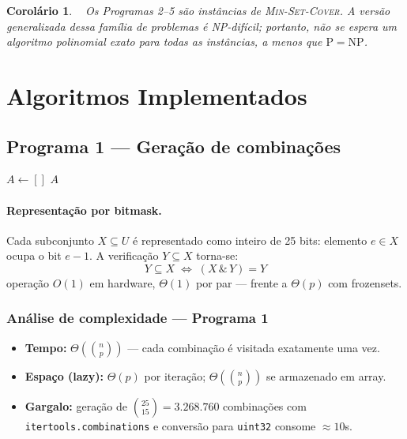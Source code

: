 \documentclass[12pt,a4paper]{article}
\newtheorem{corollary}[theorem]{Corolário}
\theoremstyle{definition}
\newcommand{\bigtheta}[1]{\Theta\!\left(#1\right)}
\newcommand{\C}[2]{\binom{#1}{#2}}
\begin{document}
\begin{corollary}
  Os Programas 2--5 são instâncias de \textsc{Min-Set-Cover}. A versão generalizada dessa família de problemas é NP-difícil; portanto, não se espera um algoritmo polinomial exato para todas as instâncias, a menos que $\mathrm{P} = \mathrm{NP}$.
\end{corollary}

\section{Algoritmos Implementados}

\subsection{Programa 1 --- Geração de combinações}

\begin{algorithm}[H]
\SetAlgoLined
{}
\BlankLine
$A \leftarrow []$\;
\Return $A$\;
\caption{Geração por bitmask}
\end{algorithm}

\paragraph{Representação por bitmask.}
Cada subconjunto $X \subseteq U$ é representado como inteiro de 25 bits:
elemento $e \in X$ ocupa o bit $e-1$. A verificação $Y \subseteq X$ torna-se:
\[
  Y \subseteq X \;\Longleftrightarrow\; (X \,\&\, Y) = Y
\]
operação $O(1)$ em hardware, $\bigtheta{1}$ por par — frente a $\bigtheta{p}$ com frozensets.

\subsubsection*{Análise de complexidade --- Programa 1}

\begin{itemize}
  \item \textbf{Tempo:} $\bigtheta{\C{n}{p}}$ — cada combinação é visitada exatamente uma vez.
  \item \textbf{Espaço (lazy):} $\bigtheta{p}$ por iteração; $\bigtheta{\C{n}{p}}$ se armazenado em array.
  \item \textbf{Gargalo:} geração de $\C{25}{15} = 3.268.760$ combinações com
        \texttt{itertools.combinations} e conversão para \texttt{uint32} consome $\approx 10$s.
\end{itemize}
\end{document}
